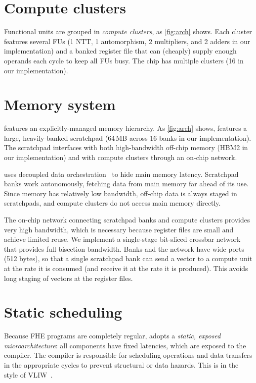 \section{Compute clusters}
Functional units are grouped in \emph{compute clusters}, as \autoref{fig:arch} shows.
Each cluster features several FUs (1 NTT, 1 automorphism, 2 multipliers, and 2 adders in our implementation)
and a banked register file that can (cheaply) supply enough operands each cycle to keep all FUs busy.
The chip has multiple clusters (16 in our implementation).





\section{Memory system} \label{sec:memsystem}
\name features an explicitly-managed memory hierarchy. As \autoref{fig:arch} shows,
\name features a large, heavily-banked scratchpad (64\,MB across {16} banks in our implementation).
The scratchpad interfaces with both high-bandwidth off-chip memory (HBM2 in our implementation)
and with compute clusters through an on-chip network.

\name uses decoupled data orchestration~\cite{pellauer:asplos19:buffets} to hide main memory latency.
Scratchpad banks work autonomously, fetching data from main memory far ahead of its use.
Since memory has relatively low bandwidth, off-chip data is always staged in scratchpads,
and compute clusters do not access main memory directly.

The on-chip network connecting scratchpad banks and compute clusters provides very high bandwidth,
which is necessary because register files are small and achieve limited reuse.
We implement a single-stage bit-sliced crossbar network~\cite{passas:tocaid12:crossbar} that provides full bisection bandwidth.
Banks and the network have wide ports (512 bytes), so that a single scratchpad bank can send a vector to a compute unit
at the rate it is consumed (and receive it at the rate it is produced).
This avoids long staging of vectors at the register files.

\section{Static scheduling}
Because FHE programs are completely regular, \name adopts a \emph{static, exposed microarchitecture}:
all components have fixed latencies, which are exposed to the compiler.
The compiler is responsible for scheduling operations and data transfers in the appropriate cycles to prevent
structural or data hazards.
This is in the style of VLIW~\cite{fisher:isca83:very}.

